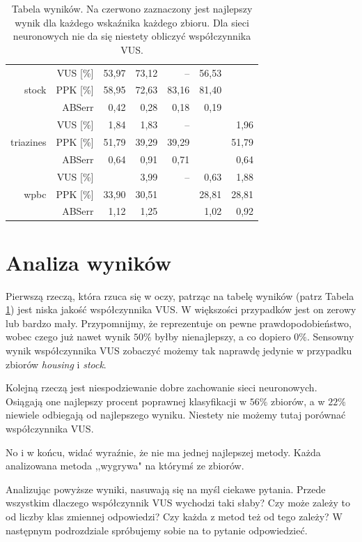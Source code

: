 \documentclass{mini}
\begin{document}
\begin{table}[h!t]
\begin{tabular}{rrrrrrr}
   \hline
\multirow{3}{15mm}{stock} & VUS [\%] & 53,97 & 73,12 & -- & 56,53 & \color{red}{96,01} \\ 
   & PPK [\%] & 58,95 & 72,63 & 83,16 & 81,40 & \color{red}{91,58} \\ 
   & ABSerr & 0,42 & 0,28 & 0,18 & 0,19 & \color{red}{0,08} \\ 
   \hline
\multirow{3}{15mm}{triazines} & VUS [\%] & 1,84 & 1,83 & -- & \color{red}{5,45} & 1,96 \\ 
   & PPK [\%] & 51,79 & 39,29 & 39,29 & \color{red}{53,57} & 51,79 \\ 
   & ABSerr & 0,64 & 0,91 & 0,71 & \color{red}{0,61} & 0,64 \\ 
   \hline
\multirow{3}{15mm}{wpbc} & VUS [\%] & \color{red}{4,44} & 3,99 & -- & 0,63 & 1,88 \\ 
   & PPK [\%] & 33,90 & 30,51 & \color{red}{35,59} & 28,81 & 28,81 \\ 
   & ABSerr & 1,12 & 1,25 & \color{red}{0,86} & 1,02 & 0,92 \\ 
   \hline
\end{tabular}
\caption{Tabela wyników. Na czerwono zaznaczony jest najlepszy wynik dla każdego wskaźnika każdego zbioru. Dla sieci neuronowych nie da się niestety obliczyć współczynnika VUS.}
\label{wyniki} 
\end{table}

\section{Analiza wyników}

Pierwszą rzeczą, która rzuca się w oczy, patrząc na tabelę wyników (patrz Tabela \ref{wyniki}) jest niska jakość współczynnika VUS. W większości przypadków jest on zerowy lub bardzo mały. Przypomnijmy, że reprezentuje on pewne prawdopodobieństwo, wobec czego już nawet wynik $50\%$ byłby nienajlepszy, a co dopiero $0\%$. Sensowny wynik współczynnika VUS zobaczyć możemy tak naprawdę jedynie w przypadku zbiorów \textit{housing} i \textit{stock}.

Kolejną rzeczą jest niespodziewanie dobre zachowanie sieci neuronowych. Osiągają one najlepszy procent poprawnej klasyfikacji w $56\%$ zbiorów, a w $22\%$ niewiele odbiegają  od najlepszego wyniku. Niestety nie możemy tutaj porównać współczynnika VUS. 

No i w końcu, widać wyraźnie, że nie ma jednej najlepszej metody. Każda analizowana metoda ,,wygrywa" na którymś ze zbiorów.

Analizując powyższe wyniki, nasuwają się na myśl ciekawe pytania. Przede wszystkim dlaczego współczynnik VUS wychodzi taki słaby? Czy może zależy to od liczby klas zmiennej odpowiedzi? Czy każda z metod też od tego zależy? W następnym podrozdziale spróbujemy sobie na to pytanie odpowiedzieć. 
\end{document}

